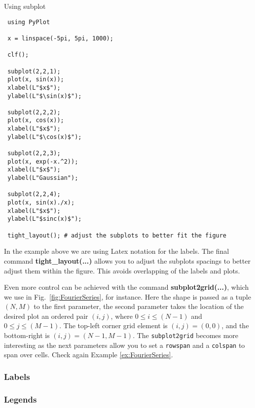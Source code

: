 \begin{example}{Using subplot}
\begin{verbatim}
 using PyPlot
 
 x = linspace(-5pi, 5pi, 1000);

 clf();
 
 subplot(2,2,1);
 plot(x, sin(x));
 xlabel(L"$x$");
 ylabel(L"$\sin(x)$");
 
 subplot(2,2,2);
 plot(x, cos(x));
 xlabel(L"$x$");
 ylabel(L"$\cos(x)$");

 subplot(2,2,3);
 plot(x, exp(-x.^2));
 xlabel(L"$x$");
 ylabel(L"Gaussian");
 
 subplot(2,2,4);
 plot(x, sin(x)./x); 
 xlabel(L"$x$");
 ylabel(L"$sinc(x)$");
 
 tight_layout(); # adjust the subplots to better fit the figure

\end{verbatim}
\end{example}

In the example above we are using Latex notation for the labels. The final command \textbf{tight\_layout(...)} allows you to adjust the subplots spacings to better adjust them within the figure. This avoids overlapping of the labels and plots.

Even more control can be achieved with the command \textbf{subplot2grid(...)}, which we use in Fig.~\ref{fig:FourierSeries}, for instance. Here the shape is passed as a tuple $(N,M)$ to the first parameter, the second parameter takes the location of the desired plot an ordered pair $(i,j)$, where $0 \leq i \leq (N-1)$ and $0 \leq j \leq (M-1)$. The top-left corner grid element is $(i,j) = (0,0)$, and the bottom-right is $(i,j) = (N-1, M-1)$. The \texttt{subplot2grid} becomes more interesting as the next parameters allow you to set a \texttt{rowspan} and a \texttt{colspan} to span over cells. Check again Example \ref{ex:FourierSeries}.


\subsubsection{Labels}


\subsubsection{Legends}


